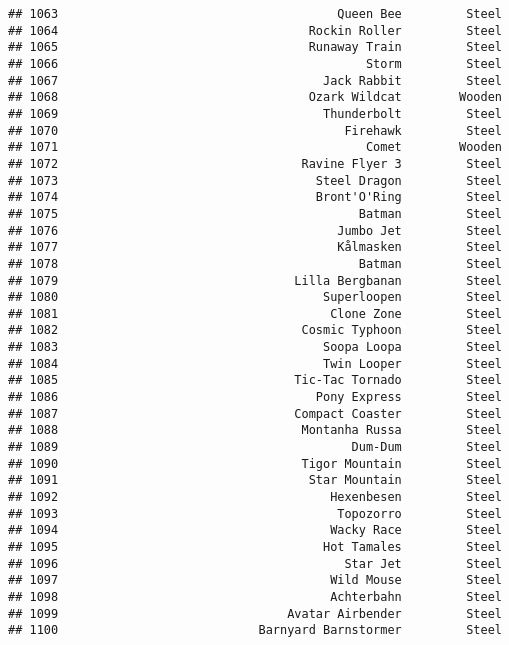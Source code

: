 \documentclass[
]{article}
\begin{document}
\begin{verbatim}
## 1063                                       Queen Bee         Steel
## 1064                                   Rockin Roller         Steel
## 1065                                   Runaway Train         Steel
## 1066                                           Storm         Steel
## 1067                                     Jack Rabbit         Steel
## 1068                                   Ozark Wildcat        Wooden
## 1069                                     Thunderbolt         Steel
## 1070                                        Firehawk         Steel
## 1071                                           Comet        Wooden
## 1072                                  Ravine Flyer 3         Steel
## 1073                                    Steel Dragon         Steel
## 1074                                    Bront'O'Ring         Steel
## 1075                                          Batman         Steel
## 1076                                       Jumbo Jet         Steel
## 1077                                       Kålmasken         Steel
## 1078                                          Batman         Steel
## 1079                                 Lilla Bergbanan         Steel
## 1080                                     Superloopen         Steel
## 1081                                      Clone Zone         Steel
## 1082                                  Cosmic Typhoon         Steel
## 1083                                     Soopa Loopa         Steel
## 1084                                     Twin Looper         Steel
## 1085                                 Tic-Tac Tornado         Steel
## 1086                                    Pony Express         Steel
## 1087                                 Compact Coaster         Steel
## 1088                                  Montanha Russa         Steel
## 1089                                         Dum-Dum         Steel
## 1090                                  Tigor Mountain         Steel
## 1091                                   Star Mountain         Steel
## 1092                                      Hexenbesen         Steel
## 1093                                       Topozorro         Steel
## 1094                                      Wacky Race         Steel
## 1095                                     Hot Tamales         Steel
## 1096                                        Star Jet         Steel
## 1097                                      Wild Mouse         Steel
## 1098                                      Achterbahn         Steel
## 1099                                Avatar Airbender         Steel
## 1100                            Barnyard Barnstormer         Steel

\end{verbatim}
\end{document}
